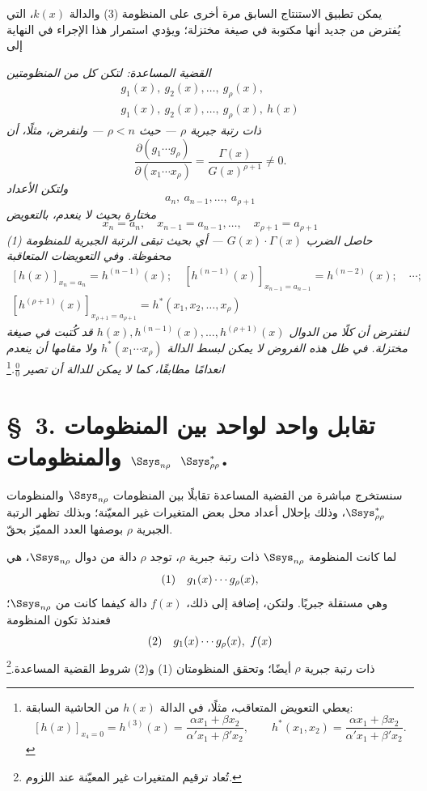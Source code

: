 \documentclass[11pt]{article}
\newcommand{\srcLTR}[1]{\relax\ifmmode\text{\mbox{\babelsublr{\foreignlanguage{english}{#1}}}}\else\babelsublr{\foreignlanguage{english}{#1}}\fi}
\newcommand{\srcfn}[2]{\begingroup\renewcommand{\thefootnote}{\srcLTR{#1}}\footnote{#2}\addtocounter{footnote}{-1}\endgroup}
\begin{document}
يمكن تطبيق الاستنتاج السابق مرة أخرى على المنظومة (3) والدالة $k(x)$، التي يُفترض من جديد أنها مكتوبة في صيغة مختزلة؛ ويؤدي استمرار هذا الإجراء في النهاية إلى

\emph{القضية المساعدة: لتكن كل من المنظومتين}
\[
\begin{array}{c}
g_1(x),\ g_2(x),\ldots,\ g_\rho(x),\\
g_1(x),\ g_2(x),\ldots,\ g_\rho(x),\ h(x)
\end{array}
\]
\emph{ذات رتبة جبرية $\rho$ --- حيث $\rho<n$ --- ولنفرض، مثلًا، أن}
\[
 \frac{\partial(g_1\cdots g_\rho)}
 {\partial(x_1\cdots x_\rho)}
 =\frac{\Gamma(x)}{G(x)^{\rho+1}}\ne0.
\]
\emph{ولتكن الأعداد}
\[
 a_n,\ a_{n-1},\ldots,\ a_{\rho+1}
\]
\emph{مختارة بحيث لا ينعدم، بالتعويض}
\[
 x_n=a_n,\quad x_{n-1}=a_{n-1},\ldots,\quad x_{\rho+1}=a_{\rho+1}
\]
\emph{حاصل الضرب $G(x)\cdot\Gamma(x)$ --- أي بحيث تبقى الرتبة الجبرية للمنظومة (1) محفوظة. وفي التعويضات المتعاقبة}
\[
\begin{array}{c}
[h(x)]_{x_n=a_n}=h^{(n-1)}(x);\quad
[h^{(n-1)}(x)]_{x_{n-1}=a_{n-1}}=h^{(n-2)}(x);\quad\cdots;\\[0.25em]
[h^{(\rho+1)}(x)]_{x_{\rho+1}=a_{\rho+1}}=h^*(x_1,x_2,\ldots,x_\rho)
\end{array}
\]
\emph{لنفترض أن كلًا من الدوال $h(x),h^{(n-1)}(x),\ldots,h^{(\rho+1)}(x)$ قد كُتبت في صيغة مختزلة. في ظل هذه الفروض لا يمكن لبسط الدالة $h^*(x_1\cdots x_\rho)$ ولا مقامها أن ينعدم انعدامًا مطابقًا، كما لا يمكن للدالة أن تصير $\frac00$.}\srcfn{**)}{يعطي التعويض المتعاقب، مثلًا، في الدالة $h(x)$ من الحاشية السابقة:
\[
 [h(x)]_{x_4=0}=h^{(3)}(x)=\frac{\alpha x_1+\beta x_2}{\alpha' x_1+\beta' x_2},\qquad
 h^*(x_1,x_2)=\frac{\alpha x_1+\beta x_2}{\alpha' x_1+\beta' x_2}.
\]}

\section*{\S\ 3. تقابل واحد لواحد بين المنظومات $\Ssys_{n\rho}$ والمنظومات $\Ssys^*_{\rho\rho}$.}

سنستخرج مباشرة من القضية المساعدة تقابلًا بين المنظومات $\Ssys_{n\rho}$ والمنظومات $\Ssys^*_{\rho\rho}$، وذلك بإحلال أعداد محل بعض المتغيرات غير المعيّنة؛ وبذلك تظهر الرتبة الجبرية $\rho$ بوصفها العدد المميّز بحقّ.

لما كانت المنظومة $\Ssys_{n\rho}$ ذات رتبة جبرية $\rho$، توجد $\rho$ دالة من دوال $\Ssys_{n\rho}$، هي
\[
\begin{array}{@{}l@{\quad}c@{}}
(1)& g_1(x)\cdots g_\rho(x),
\end{array}
\]
وهي مستقلة جبريًا. ولتكن، إضافة إلى ذلك، $f(x)$ دالة كيفما كانت من $\Ssys_{n\rho}$؛ فعندئذ تكون المنظومة
\[
\begin{array}{@{}l@{\quad}c@{}}
(2)& g_1(x)\cdots g_\rho(x),\ f(x)
\end{array}
\]
ذات رتبة جبرية $\rho$ أيضًا؛ وتحقق المنظومتان (1) و(2) شروط القضية المساعدة.\srcfn{*)}{تُعاد ترقيم المتغيرات غير المعيّنة عند اللزوم.}
\end{document}
